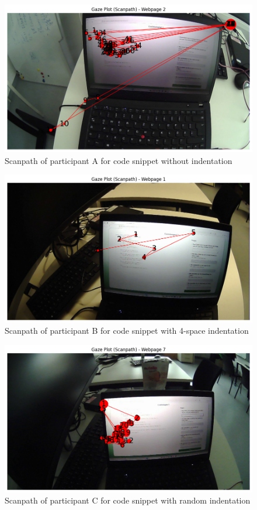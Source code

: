 \begin{figure} [H]
  \centering
  \includegraphics[scale=0.6]{figures/0-ind-rechner.png}
  \caption{Scanpath of participant A for code snippet without indentation }
  \label{fig:AnhangsChor}
\end{figure}
 

\begin{figure} [H]
  \centering
  \includegraphics[scale=0.6]{figures/4-ind.png}
  \caption{Scanpath of participant B for code snippet with 4-space indentation}
  \label{fig:AnhangsChor}
\end{figure}


\begin{figure} [H]
  \centering
  \includegraphics[scale=0.6]{figures/r-ind.png}
  \caption{Scanpath of  participant C for code snippet with random indentation}
  \label{fig:AnhangsChor}
\end{figure}



